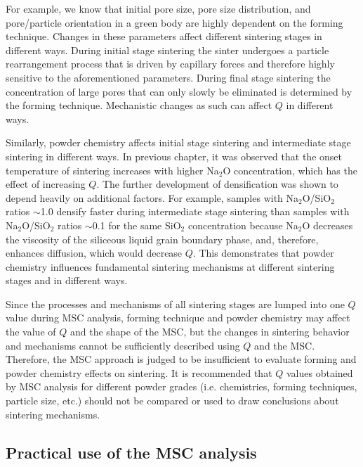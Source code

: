 For example, we know that initial pore size, pore size distribution, and pore/particle orientation in a green body are highly dependent on the forming technique. Changes in these parameters affect different sintering stages in different ways. During initial stage sintering the sinter undergoes a particle rearrangement process that is driven by capillary forces and therefore highly sensitive to the aforementioned parameters. During final stage sintering the concentration of large pores that can only slowly be eliminated is determined by the forming technique. Mechanistic changes as such can affect $Q$ in different ways.

Similarly, powder chemistry affects initial stage sintering and intermediate stage sintering in different ways. In previous chapter, it was observed that the onset temperature of sintering increases with higher Na$_{2}$O concentration, which has the effect of increasing $Q$. The further development of densification was shown to depend heavily on additional factors. For example, samples with Na$_{2}$O/SiO$_{2}$ ratios $\sim$1.0 densify faster during intermediate stage sintering than samples with Na$_{2}$O/SiO$_{2}$ ratios $\sim$0.1 for the same SiO$_{2}$ concentration because Na$_{2}$O decreases the viscosity of the siliceous liquid grain boundary phase, and, therefore, enhances diffusion, which would decrease $Q$. This demonstrates that powder chemistry influences fundamental sintering mechanisms at different sintering stages and in different ways. 

Since the processes and mechanisms of all sintering stages are lumped into one $Q$ value during MSC analysis, forming technique and powder chemistry may affect the value of $Q$ and the shape of the MSC, but the changes in sintering behavior and mechanisms cannot be sufficiently described using $Q$ and the MSC. Therefore, the MSC approach is judged to be insufficient to evaluate forming and powder chemistry effects on sintering. It is recommended that $Q$ values obtained by MSC analysis for different powder grades (i.e. chemistries, forming techniques, particle size, etc.) should not be compared or used to draw conclusions about sintering mechanisms.

\subsection{Practical use of the MSC analysis}

